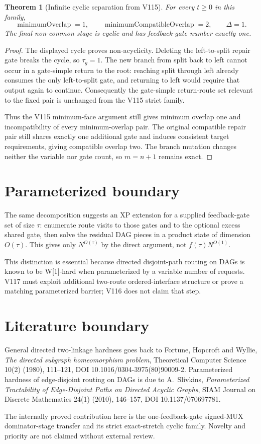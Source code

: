 \documentclass[11pt]{article}
\newtheorem{theorem}{Theorem}
\begin{document}
\begin{theorem}[Infinite cyclic separation from V115]
For every $t\geq0$ in this family,
\[
\operatorname{minimumOverlap}=1,\qquad
\operatorname{minimumCompatibleOverlap}=2,\qquad
\Delta=1.
\]
The final non-common stage is cyclic and has feedback-gate number exactly one.
\end{theorem}
\begin{proof}
The displayed cycle proves non-acyclicity. Deleting the left-to-split repair gate breaks the cycle, so $\tau_g=1$. The new branch from split back to left cannot occur in a gate-simple return to the root: reaching split through left already consumes the only left-to-split gate, and returning to left would require that output again to continue. Consequently the gate-simple return-route set relevant to the fixed pair is unchanged from the V115 strict family.

Thus the V115 minimum-face argument still gives minimum overlap one and incompatibility of every minimum-overlap pair. The original compatible repair pair still shares exactly one additional gate and induces consistent target requirements, giving compatible overlap two. The branch mutation changes neither the variable nor gate count, so $m=n+1$ remains exact.
\end{proof}

\section{Parameterized boundary}
The same decomposition suggests an XP extension for a supplied feedback-gate set of size $\tau$: enumerate route visits to those gates and to the optional excess shared gate, then solve the residual DAG pieces in a product state of dimension $O(\tau)$. This gives only $N^{O(\tau)}$ by the direct argument, not $f(\tau)N^{O(1)}$.

This distinction is essential because directed disjoint-path routing on DAGs is known to be W[1]-hard when parameterized by a variable number of requests. V117 must exploit additional two-route ordered-interface structure or prove a matching parameterized barrier; V116 does not claim that step.

\section{Literature boundary}
General directed two-linkage hardness goes back to Fortune, Hopcroft and Wyllie, \emph{The directed subgraph homeomorphism problem}, Theoretical Computer Science 10(2) (1980), 111--121, DOI 10.1016/0304-3975(80)90009-2. Parameterized hardness of edge-disjoint routing on DAGs is due to A.~Slivkins, \emph{Parameterized Tractability of Edge-Disjoint Paths on Directed Acyclic Graphs}, SIAM Journal on Discrete Mathematics 24(1) (2010), 146--157, DOI 10.1137/070697781.

The internally proved contribution here is the one-feedback-gate signed-MUX dominator-stage transfer and its strict exact-stretch cyclic family. Novelty and priority are not claimed without external review.
\end{document}
